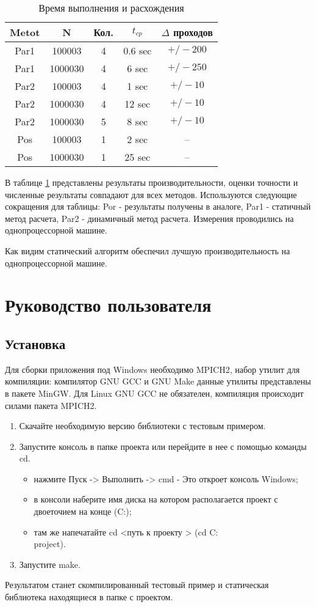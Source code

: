 \begin{table}
	\caption{Время выполнения и расхождения}
	\label{sample_table}
\begin{tabular}{|c|c|c|c|c|}
\hline 
Metot & N & Кол.& $t_{cp}$ & $\Delta$ проходов \\ \hline
Par1 & 100003 & 4 & 0.6 sec & $+/- 200 $ \\ \hline
Par1 & 1000030 & 4& 6 sec & $+/- 250 $ \\ \hline
Par2 & 100003 & 4 &1 sec & $+/- 10 $ \\ \hline
Par2 & 1000030 & 4 & 12 sec & $+/- 10 $ \\ \hline
Par2 & 1000030 & 5 & 8 sec & $+/- 10 $ \\ \hline
Pos & 100003 & 1 &2 sec & -- \\ \hline
Pos & 1000030 & 1 &25 sec & -- \\ \hline
\end{tabular}
\end{table}

В таблице \ref{sample_table} представлены результаты производительности, оценки точности и численные результаты совпадают для всех методов. Используются следующие сокращения для таблицы: Por - результаты получены в аналоге, Par1 - статичный метод расчета, Par2 - динамичный метод расчета. Измерения проводились на однопроцессорной машине.

Как видим статический алгоритм обеспечил лучшую производительность на однопроцессорной машине.
\chapter{Руководство пользователя}
\section{Установка}
Для сборки приложения под Windows необходимо MPICH2, набор утилит для компиляции: компилятор GNU GCC и GNU Make данные утилиты представлены в пакете MinGW. Для Linux GNU GCC не обязателен, компиляция происходит силами пакета MPICH2.
\begin{enumerate}
	\item Скачайте необходимую версию библиотеки с тестовым примером.
	\item Запустите консоль в папке проекта или перейдите в нее с помощью команды cd.
	\begin{itemize}
		\item нажмите Пуск -> Выполнить -> cmd - Это откроет консоль Windows;
		\item в консоли наберите имя диска на котором располагается проект с двоеточием на конце (C:);
		\item там же напечатайте cd <путь к проекту > (cd C:\\project).
	\end{itemize}
	\item Запустите make.
\end{enumerate}
Результатом станет скомпилированный тестовый пример и статическая библиотека находящиеся в папке с проектом.


